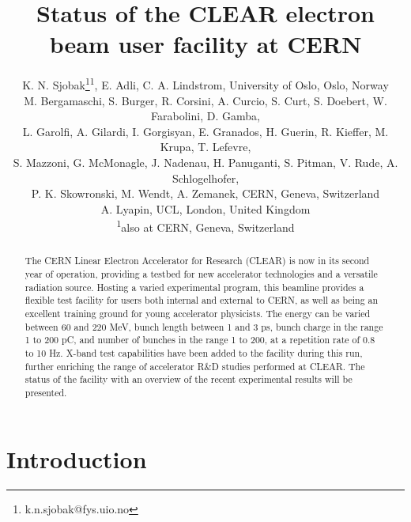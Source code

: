 \documentclass[a4paper,
               keeplastbox,   %
               ]{jacow}
\begin{document}
\title{Status of the CLEAR electron beam user facility at CERN}

\author{K. N. Sjobak\thanks{k.n.sjobak@fys.uio.no}\textsuperscript{1}, E. Adli, C. A. Lindstrom, University of Oslo, Oslo, Norway\\
  M. Bergamaschi, S. Burger, R. Corsini, A. Curcio, S. Curt, S. Doebert, W. Farabolini, D. Gamba,\\
  L. Garolfi, A. Gilardi, I. Gorgisyan, E. Granados, H. Guerin, R. Kieffer, M. Krupa, T. Lefevre,\\
  S. Mazzoni, G. McMonagle, J. Nadenau, H. Panuganti, S. Pitman, V. Rude, A. Schlogelhofer,\\
  P. K. Skowronski, M. Wendt, A. Zemanek, CERN, Geneva, Switzerland \\
  A. Lyapin, UCL, London, United Kingdom \\
  \textsuperscript{1}also at CERN, Geneva, Switzerland}

\maketitle

%
\begin{abstract}
  The CERN Linear Electron Accelerator for Research (CLEAR) is now in its second year of operation, providing a testbed for new accelerator technologies and a versatile radiation source.
  Hosting a varied experimental program, this beamline provides a flexible test facility for users both internal and external to CERN, as well as being an excellent training ground for young accelerator physicists.
  The energy can be varied between 60 and 220 MeV, bunch length between 1 and 3 ps, bunch charge in the range 1 to 200 pC, and number of bunches in the range 1 to 200, at a repetition rate of 0.8 to 10 Hz.
  X-band test capabilities have been added to the facility during this run, further enriching the range of accelerator R\&D studies performed at CLEAR.
  The status of the facility with an overview of the recent experimental results will be presented.
\end{abstract}

\section{Introduction}
\end{document}
